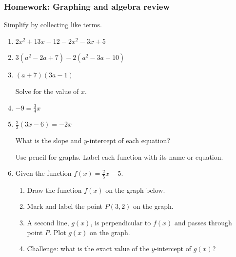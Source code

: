 \documentclass[12pt, twoside]{article}
\begin{document}
\subsubsection*{Homework: Graphing and algebra review}
Simplify by collecting like terms.

  \begin{enumerate}

\item $2x^2+13x -12 -2x^2-3x+5$ \vspace{3cm}
\item $3(a^2-2a +7) -2(a^2-3a-10)$ \vspace{5cm}
\item $(a +7)(3a-1)$ \vspace{3cm}


Solve for the value of $x$.
\item   $-9= \frac{3}{4}x$ \vspace{3cm}
\item   $\frac{2}{3}(3x-6)=-2x$ \vspace{3cm}

\newpage
What is the slope and $y$-intercept of each equation?
   \vspace{3cm}

Use pencil for graphs. Label each function with its name or equation.
\item Given the function $f(x)=\frac{2}{5}x-5$.
\begin{enumerate}
    \item Draw the function $f(x)$ on the graph below.
    \item Mark and label the point $P (3, 2)$ on the graph.
    \item A second line, $g(x)$, is perpendicular to $f(x)$ and passes through point $P$. Plot $g(x)$ on the graph.
    \item Challenge: what is the exact value of the $y$-intercept of $g(x)$?
\end{enumerate}


\end{enumerate}
\end{document}
